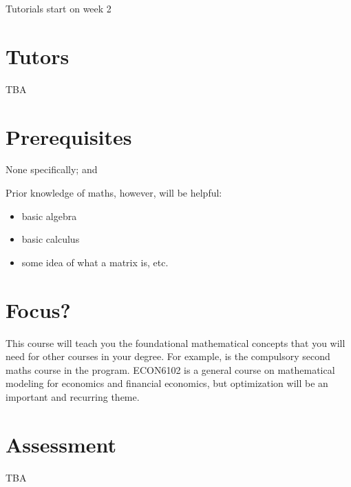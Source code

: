 \documentclass[letterpaper,10pt,english]{jupyterBook}
\begin{document}
\sphinxAtStartPar
Tutorials start on week 2


\section{Tutors}
\label{\detokenize{00.intro:tutors}}
\sphinxAtStartPar
TBA


\section{Prerequisites}
\label{\detokenize{00.intro:prerequisites}}
\sphinxAtStartPar
None specifically;  and

\sphinxAtStartPar
Prior knowledge of maths, however, will be helpful:
\begin{itemize}
\item {} 
\sphinxAtStartPar
basic algebra

\item {} 
\sphinxAtStartPar
basic calculus

\item {} 
\sphinxAtStartPar
some idea of what a matrix is, etc.

\end{itemize}


\section{Focus?}
\label{\detokenize{00.intro:focus}}
\sphinxAtStartPar
This course will teach you the foundational mathematical concepts that you will need for other courses in your degree.  For example,  is the compulsory second maths course in the  program.  ECON6102 is a general course on mathematical modeling for economics and financial economics, but optimization will be an important and recurring theme.


\section{Assessment}
\label{\detokenize{00.intro:assessment}}
\sphinxAtStartPar
TBA
\end{document}
